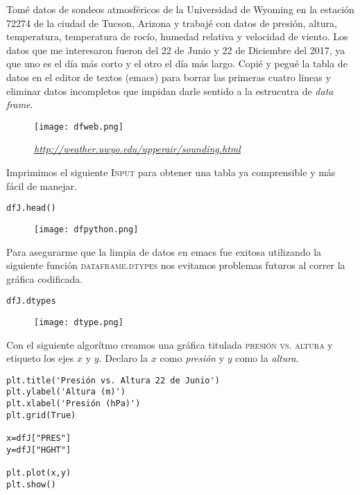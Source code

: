\documentclass[12pt]{article}
\begin{document}
Tom\'e datos de sondeos atmosf\'ericos de la Universidad de Wyoming en la estaci\'on 72274 de la ciudad de Tucson, Arizona y trabaj\'e con datos de presi\'on, altura, temperatura, temperatura de roc\'io, humedad relativa y velocidad de viento. Los datos que me interesaron fueron del 22 de Junio y 22 de Diciembre del 2017, ya que uno es el d\'ia m\'as corto y el otro el d\'ia m\'as largo. Copi\'e y pegu\'e la tabla de datos en el editor de textos (emacs) para borrar las primeras cuatro lineas y eliminar datos incompletos que impidan darle sentido a la estrucutra de \emph{data frame}.

\begin{figure}[H]
\texttt{[image: dfweb.png]}
\centering
\caption{\emph{\scriptsize{\url{http://weather.uwyo.edu/upperair/sounding.html}}}}
\end{figure}

Imprimimos el siguiente \textsc{Input} para obtener una tabla ya comprensible y m\'as f\'acil de manejar. 

\begin{verbatim}
dfJ.head()
\end{verbatim}

\begin{figure}[H]
\texttt{[image: dfpython.png]}
\centering
\end{figure}

Para asegurarme que la limpia de datos en emacs fue exitosa utilizando la siguiente funci\'on \textsc{dataframe.dtypes} nos evitamos problemas futuros al correr la gr\'afica codificada. 
\begin{verbatim}
dfJ.dtypes
\end{verbatim}

\begin{figure}[H]
\texttt{[image: dtype.png]}
\centering
\end{figure}

Con el siguiente algor\'itmo creamos una gr\'afica titulada \textsc{presi\'on vs. altura} y etiqueto los ejes $x$ y $y$. Declaro la $x$ como \emph{presi\'on} y $y$ como la \emph{altura}.

\begin{verbatim}
plt.title('Presión vs. Altura 22 de Junio')
plt.ylabel('Altura (m)')
plt.xlabel('Presión (hPa)')
plt.grid(True)

x=dfJ["PRES"]
y=dfJ["HGHT"]

plt.plot(x,y)
plt.show()
\end{verbatim}
\end{document}
